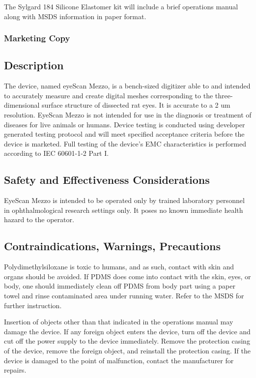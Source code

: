 The Sylgard 184 Silicone Elastomer kit will include a brief operations manual along with MSDS information in paper format. 

\subsubsection{Marketing Copy}

\subsection{Description}
The device, named eyeScan Mezzo, is a bench-sized digitizer able to  and intended to accurately measure and create digital meshes corresponding to the three-dimensional surface structure of dissected rat eyes. It is accurate to a 2 um resolution. EyeScan Mezzo is not intended for use in the diagnosis or treatment of diseases for live animals or humans. Device testing is conducted using developer generated testing protocol and will meet specified acceptance criteria before the device is marketed. Full testing of the device's EMC characteristics is performed according to IEC 60601-1-2 Part I.

\subsection{Safety and Effectiveness Considerations}

EyeScan Mezzo is intended to be operated only by trained laboratory personnel in ophthalmological research settings only. It poses no known immediate health hazard to the operator. 

\subsection{Contraindications, Warnings, Precautions}

Polydimethylsiloxane is toxic to humans, and as such, contact with skin and organs should be avoided. If PDMS does come into contact with the skin, eyes, or body, one should immediately clean off PDMS from body part using a paper towel and rinse contaminated area under running water. Refer to the MSDS for further instruction.

Insertion of objects other than that indicated in the operations manual may damage the device.
If any foreign object enters the device, turn off the device and cut off the power supply to the device immediately. Remove the protection casing of the device, remove the foreign object, and reinstall the protection casing. If the device is damaged to the point of malfunction, contact the manufacturer for repairs. 


